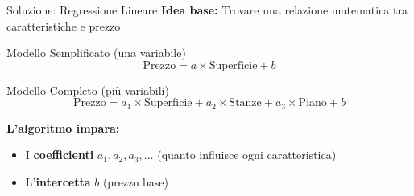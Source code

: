 \documentclass[aspectratio=169]{beamer}
\begin{document}
%
\begin{frame}{Soluzione: Regressione Lineare}
\textbf{Idea base:} Trovare una relazione matematica tra caratteristiche e prezzo

\vspace{0.5cm}

\begin{block}{Modello Semplificato (una variabile)}
$$\text{Prezzo} = a \times \text{Superficie} + b$$
\end{block}

\vspace{0.5cm}

\begin{block}{Modello Completo (più variabili)}
$$\text{Prezzo} = a_1 \times \text{Superficie} + a_2 \times \text{Stanze} + a_3 \times \text{Piano} + b$$
\end{block}

\vspace{0.5cm}

\textbf{L'algoritmo impara:}
\begin{itemize}
    \item I \textbf{coefficienti} $a_1, a_2, a_3, \ldots$ (quanto influisce ogni caratteristica)
    \item L'\textbf{intercetta} $b$ (prezzo base)
\end{itemize}
\end{frame}
%
%
\end{document}
